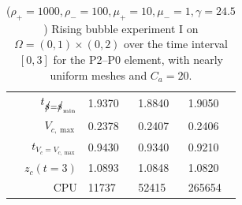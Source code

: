 \begin{table}
\begin{tabular}{rlll}
$t_{\strikes = \strikes_{\min}}$ & 1.9370 & 1.8840 & 1.9050 \\
$V_{c,\max}$                     & 0.2378 & 0.2407 & 0.2406 \\
$t_{V_c = V_{c,\max}}$           & 0.9430 & 0.9340 & 0.9210 \\
$z_c(t=3)$                       & 1.0893 & 1.0848 & 1.0820 \\
CPU                              &  11737 &  52415 & 265654 \\
\hline
\end{tabular}
\hspace*{-3.25cm}
\caption[Navier--Stokes rising bubble I benchmark values P2--P0]
{($\rho_+ = 1000,\rho_- = 100,\mu_+ = 10,\mu_- =1,\gamma = 24.5$)
Rising bubble experiment I on ${\Omega = (0,1) \times (0,2)}$ over the time
interval $[0,3]$ for the P2--P0 element, with nearly uniform meshes and
$C_a=20$\textdegree.}
\label{tab:risingbubbleIp2p0}
\end{table}

